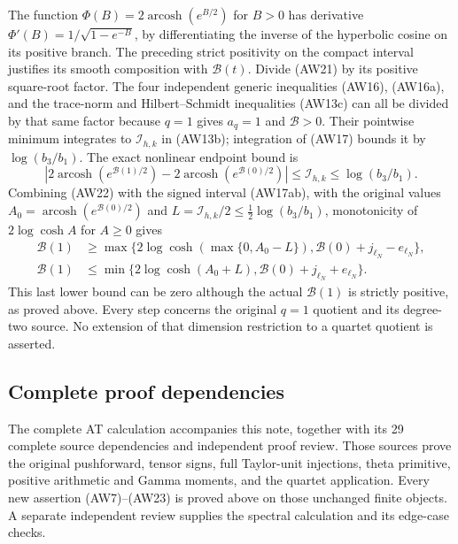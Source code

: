 The function $\Phi(B)=2\operatorname{arcosh}(e^{B/2})$
for $B>0$ has derivative
$\Phi'(B)=1/\sqrt{1-e^{-B}}$, by differentiating the
inverse of the hyperbolic cosine on its positive branch.
The preceding strict positivity on the compact interval
justifies its smooth composition with $\mathcal B(t)$.
Divide (AW21) by its positive square-root factor. The four
independent generic inequalities (AW16), (AW16a), and the trace-norm
and Hilbert--Schmidt inequalities (AW13c) can all be divided by
that same factor because $q=1$ gives $a_q=1$ and $\mathcal B>0$.
Their pointwise minimum integrates to $\mathcal I_{h,k}$ in
(AW13b); integration of (AW17) bounds it by $\log(b_3/b_1)$. The exact nonlinear endpoint bound is
\[
 \left|2\operatorname{arcosh}(e^{\mathcal B(1)/2})
       -2\operatorname{arcosh}(e^{\mathcal B(0)/2})\right|
       \le\mathcal I_{h,k}\le\log(b_3/b_1).
 \tag{AW22}
\]
Combining (AW22) with the signed interval (AW17ab), with the original values
$A_0=\operatorname{arcosh}(e^{\mathcal B(0)/2})$
and $L=\mathcal I_{h,k}/2\le\tfrac12\log(b_3/b_1)$, monotonicity of
$2\log\cosh A$ for $A\ge0$ gives
\[
 \begin{aligned}
 \mathcal B(1)&\ge
 \max\{2\log\cosh(\max\{0,A_0-L\}),
          \mathcal B(0)+j_{\ell_N}-e_{\ell_N}\},\\
 \mathcal B(1)&\le
 \min\{2\log\cosh(A_0+L),
          \mathcal B(0)+j_{\ell_N}+e_{\ell_N}\}.
 \end{aligned}
 \tag{AW23}
\]
This last lower bound can be zero although the actual
$\mathcal B(1)$ is strictly positive, as proved above.
Every step concerns the original $q=1$ quotient and its
degree-two source. No extension of that dimension restriction
to a quartet quotient is asserted.

\subsection{Complete proof dependencies}

The complete AT calculation accompanies this note, together with its
29 complete source dependencies and independent proof review. Those
sources prove the original pushforward, tensor signs, full Taylor-unit
injections, theta primitive, positive arithmetic and Gamma moments,
and the quartet application. Every new assertion (AW7)--(AW23) is
proved above on those unchanged finite objects. A separate independent
review supplies the spectral calculation and its edge-case checks.

\endgroup
